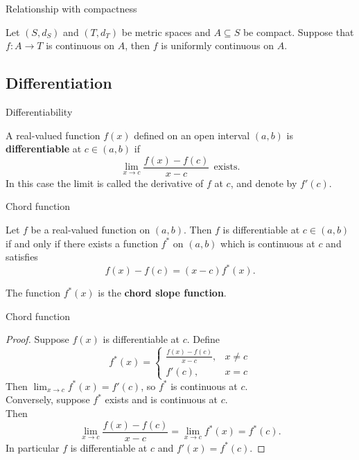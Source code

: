 \documentclass{beamer}
\begin{document}
\begin{frame}{Relationship with compactness}

\begin{thm}[Heine]
Let $(S,d_S)$ and $(T,d_T)$ be metric spaces and $A\subseteq S$ be compact.
Suppose that $f: A\rightarrow T$ is continuous on $A$, then $f$ is uniformly continuous on $A$.
\end{thm}
\end{frame}

\subsection{Differentiation}

\begin{frame}{Differentiability}
\begin{defn}
A real-valued function $f(x)$ defined on an open interval $(a,b)$ is \textbf{differentiable} at $c\in (a,b)$ if
$$\lim_{x\rightarrow c}\frac{f(x)-f(c)}{x-c}\ \ \text{exists}.$$
In this case the limit is called the derivative of $f$ at $c$, and denote by $f'(c)$.
\end{defn}
\end{frame}

\begin{frame}{Chord function}
\begin{thm}
Let $f$ be a real-valued function on $(a,b)$.  Then $f$ is differentiable at $c\in (a,b)$ if and only if there exists a function $f^*$ on $(a,b)$ which is continuous at $c$ and satisfies
$$f(x)-f(c) = (x-c)f^*(x).$$
\end{thm}
\pause
The function $f^*(x)$ is the \textbf{chord slope function}.
\end{frame}

\begin{frame}{Chord function}
\begin{proof}
\pause
Suppose $f(x)$ is differentiable at $c$.
\pause
Define
$$f^*(x) = \left\lbrace\begin{array}{cc}
\frac{f(x)-f(c)}{x-c}, & x\neq c\\
f'(c), & x= c
\end{array}\right.$$
\pause
Then $\lim_{x\rightarrow c} f^*(x) = f'(c)$, so $f^*$ is continuous at $c$.\\
\pause
Conversely, suppose $f^*$ exists and is continuous at $c$.\\
\pause
Then
$$\lim_{x\rightarrow c} \frac{f(x)-f(c)}{x-c} = \lim_{x\rightarrow c} f^*(x) = f^*(c).$$
\pause
In particular $f$ is differentiable at $c$ and $f'(x) = f^*(c)$.
\end{proof}
\end{frame}
\end{document}
